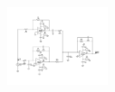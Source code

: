\documentclass[25pt, a0paper, portrait, margin=0mm, innermargin=15mm, blockverticalspace=15mm, colspace=15mm, subcolspace=8mm]{tikzposter}
\begin{document}
\begin{columns}
{\begin{multicols}{2}




\end{multicols}
}

{
\begin{multicols}{2}
\begin{center}
\includegraphics[width=0.23\textwidth,keepaspectratio]{circuit_diagram.pdf}
\end{center}


\end{multicols}}
\end{columns}
\end{document}
